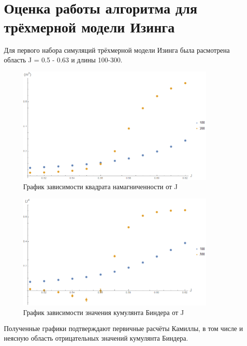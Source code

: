 \section{Оценка работы алгоритма для трёхмерной модели Изинга}

Для первого набора симуляций трёхмерной модели Изинга была расмотрена область J = 0.5 - 0.63 и длины 100-300.

\begin{figure}[!h]
    \centering
    \includegraphics[width=100mm]{Sections/Images/m2_3D_50to60.png}
    \caption{График зависимости квадрата намагниченности от J}
    \label{fig:m2_3D}
\end{figure}

\begin{figure}[!h]
    \centering
    \includegraphics[width=100mm]{Sections/Images/U4_3D_50to60.png}
    \caption{График зависимости значения кумулянта Биндера от J}
    \label{fig:U4_3D}
\end{figure}

Полученные графики подтверждают первичные расчёты Камиллы, в том числе и неясную область отрицательных значений кумулянта Биндера.